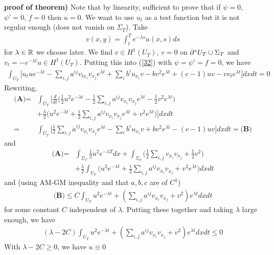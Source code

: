 \documentclass[12pt,a4paper]{report}
\newenvironment{proof}
{\begin{changemargin}{1cm}{0.5cm} 
	}%
	{\end{changemargin}
}
\begin{document}
\begin{proof}
\textbf{proof of theorem)} Note that by linearity, sufficient to prove that if $\psi = 0$, $\psi'=0$, $f=0$ then $u=0$. We want to use $u_t$ as a test function but it is not regular enough (does not vanish on $\Sigma_T$). Take
\begin{align*}
v(x,y) = \int_t^T e^{-\lambda s} u(x,s) ds
\end{align*}
for $\lambda\in \mathbb{R}$ we choose later. We find $v\in H^1(U_T)$, $v=0$ on $\partial^* U_T \cup \Sigma_T$ and $v_t = -e^{-\lambda t} u \in H^1(U_T)$. Putting this into (\ref{32}) with $\psi = \psi' =f=0$, we have
\begin{align*}
\int_{U_T} \Big[ u_t u e^{-\lambda t} - \sum_{i,j} a^{ij} v_{tx_i} v_{x_j} e^{\lambda t} + \sum_{i} b^i u_{x_i} v - bv^2 e^{\lambda t} + (c- 1)uv -   vv_t e^{\lambda t} \Big] dxdt = 0
\end{align*}
Rewriting,
\begin{align*}
\textbf{(A)} =& \int_{U_T} \Big[ \frac{d}{dt} \Big( \frac{1}{2}u^2 e^{-\lambda t} -\frac{1}{2} \sum_{i,j}a^{ij} v_{x_i}v_{x_j} e^{\lambda t} - \frac{1}{2}v^2 e^{\lambda t} \Big) \\
&+ \frac{\lambda}{2} \Big( u^2 e^{-\lambda t} + \frac{1}{2} \sum_{i,j} a^{ij}v_{x_i}v_{x_j} e^{\lambda t} + v^2 e^{\lambda t} \Big) \Big] dxdt \\
=& \int_{U_T} \Big[ \frac{1}{2} \sum_{i,j} \dot{a}^{ij} v_{x_i}v_{x_j} e^{\lambda t} - \sum_{i} b^i u_{x_i} v + bv^2 e^{\lambda t} -(c-1)uv \Big] dxdt = \textbf{(B)}
\end{align*}
and
\begin{align*}
\textbf{(A)} = & \int_{\Sigma_T} \frac{1}{2} u^2 e^{-\lambda T} dx + \int_{\Sigma_0} \Big( \frac{1}{2} \sum_{i,j} v_{x_i} v_{x_j}  + \frac{1}{2} v^2\Big) \\
& + \frac{\lambda}{2} \int_{U_T} \Big( u^2 e^{-\lambda t} + \frac{1}{2} \sum_{i,j} a^{ij} v_{x_i}v_{x_j} + v^2 e^{\lambda t} \Big) dxdt
\end{align*}
and (using AM-GM inequality and that $a,b,c$ are of $C^1$)
\begin{align*}
\textbf{(B)} \leq C \int_{U_T} u^2 e^{-\lambda t} + (\sum_{i,j} a^{ij} v_{x_i} v_{x_j} + v^2)e^{\lambda t} dxdt
\end{align*}
for some constant $C$ independent of $\lambda$. Putting these together and taking $\lambda$ large enough, we have
\begin{align*}
(\lambda -2C) \int_{U_T} u^2 e^{-\lambda t} + (\sum_{i,j} a^{ij}v_{x_i}v_{x_j} + v^2)e^{\lambda t} dxdt \leq 0
\end{align*}
With $\lambda -2C \geq 0$, we have $u\equiv 0$

\eop
\end{proof}
\s
\end{document}
